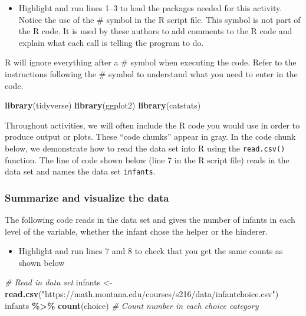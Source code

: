 \documentclass[
]{report}
\newenvironment{Shaded}{\begin{snugshade}}{\end{snugshade}}
\newcommand{\CommentTok}[1]{\textcolor[rgb]{0.56,0.35,0.01}{\textit{#1}}}
\newcommand{\FunctionTok}[1]{\textcolor[rgb]{0.13,0.29,0.53}{\textbf{#1}}}
\newcommand{\NormalTok}[1]{#1}
\newcommand{\OtherTok}[1]{\textcolor[rgb]{0.56,0.35,0.01}{#1}}
\newcommand{\SpecialCharTok}[1]{\textcolor[rgb]{0.81,0.36,0.00}{\textbf{#1}}}
\newcommand{\StringTok}[1]{\textcolor[rgb]{0.31,0.60,0.02}{#1}}
\providecommand{\tightlist}{%
  \setlength{\itemsep}{0pt}\setlength{\parskip}{0pt}}
\begin{document}
\begin{itemize}
\tightlist
\item
  Highlight and run lines 1--3 to load the packages needed for this activity. Notice the use of the \# symbol in the R script file. This symbol is not part of the R code. It is used by these authors to add comments to the R code and explain what each call is telling the program to do.
\end{itemize}

R will ignore everything after a \# symbol when executing the code. Refer to the instructions following the \# symbol to understand what you need to enter in the code.

\begin{Shaded}
\begin{Highlighting}[]
\FunctionTok{library}\NormalTok{(tidyverse)}
\FunctionTok{library}\NormalTok{(ggplot2)}
\FunctionTok{library}\NormalTok{(catstats)}
\end{Highlighting}
\end{Shaded}

Throughout activities, we will often include the R code you would use in order to produce output or plots. These ``code chunks'' appear in gray. In the code chunk below, we demonstrate how to read the data set into R using the \texttt{read.csv()} function. The line of code shown below (line 7 in the R script file) reads in the data set and names the data set \texttt{infants}.

\subsubsection*{Summarize and visualize the data}\label{summarize-and-visualize-the-data}

The following code reads in the data set and gives the number of infants in each level of the variable, whether the infant chose the helper or the hinderer.

\begin{itemize}
\tightlist
\item
  Highlight and run lines 7 and 8 to check that you get the same counts as shown below
\end{itemize}

\begin{Shaded}
\begin{Highlighting}[]
 \CommentTok{\# Read in data set}
\NormalTok{infants }\OtherTok{\textless{}{-}} \FunctionTok{read.csv}\NormalTok{(}\StringTok{"https://math.montana.edu/courses/s216/data/infantchoice.csv"}\NormalTok{)}
\NormalTok{infants }\SpecialCharTok{\%\textgreater{}\%} \FunctionTok{count}\NormalTok{(choice)  }\CommentTok{\# Count number in each choice category}
\end{Highlighting}
\end{Shaded}
\end{document}
